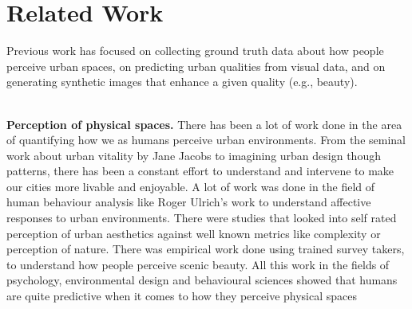 \section{Related Work}
\label{sec:related}
Previous work has focused on collecting ground truth data about how people perceive urban spaces, on predicting urban qualities from visual data, and on generating synthetic images that enhance a given quality (e.g., beauty). 

\mbox{}\\
\noindent
\sj
{\textbf{Perception of physical spaces.}
There has been a lot of work done in the area of quantifying how we as humans perceive urban environments. From the seminal work about urban vitality by Jane Jacobs\cite{jacobs1961death} to imagining urban design though patterns\cite{alexander1977pattern}, there has been a constant effort to understand and intervene to make our cities more livable and enjoyable. A lot of work was done in the field of human behaviour analysis like Roger Ulrich's work to understand affective responses to urban environments\cite{ulrich1983aesthetic}. There were studies that looked into self rated perception of urban aesthetics against well known metrics like complexity\cite{kaplan1972rated} or perception of nature\cite{kaplan1989experience}. There was empirical work done using trained survey takers, to understand how people perceive scenic beauty\cite{real2000classification}. All this work in the fields of psychology, environmental design and behavioural sciences showed that humans are quite predictive when it comes to how they perceive physical spaces}
\mbox{}\\

